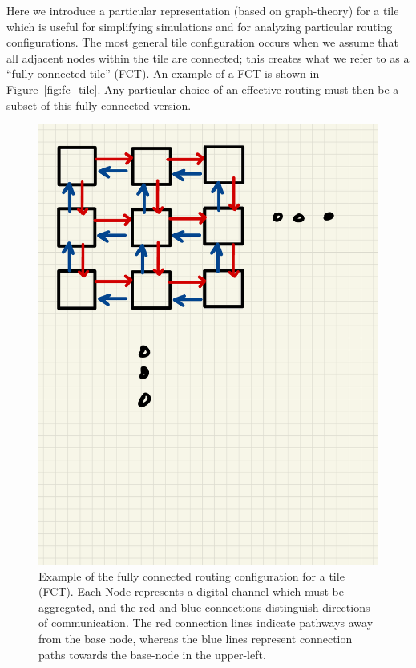 Here we introduce a particular representation (based on graph-theory) for a tile which is useful for simplifying simulations and for analyzing particular routing configurations.
The most general tile configuration occurs when we assume that all adjacent nodes within the tile are connected; this creates what we refer to as a ``fully connected tile'' (FCT).
An example of a FCT is shown in Figure~\ref{fig:fc_tile}.
Any particular choice of an effective routing must then be a subset of this fully connected version.

\begin{figure}[]
\centering
\includegraphics[width=\textwidth]{images/Notes.pdf}
\caption{Example of the fully connected routing configuration for a tile (FCT). Each Node represents a digital channel which must be aggregated, and the red and blue connections distinguish directions of communication. The red connection lines indicate pathways away from the base node, whereas the blue lines represent connection paths towards the base-node in the upper-left.}
\end{figure}~\label{fig:fc_tile}

